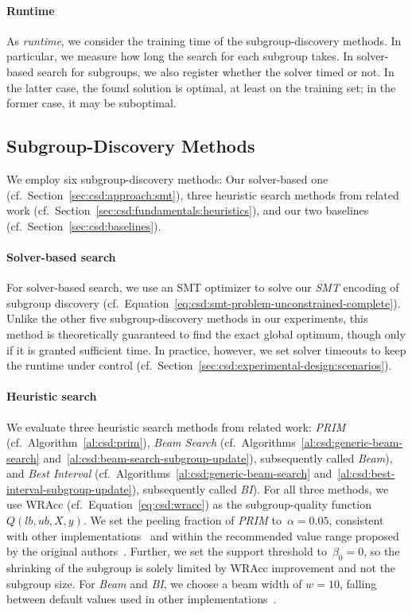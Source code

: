 \documentclass{article}
\theoremstyle{definition}
\begin{document}
\paragraph{Runtime}

As \emph{runtime}, we consider the training time of the subgroup-discovery methods.
In particular, we measure how long the search for each subgroup takes.
In solver-based search for subgroups, we also register whether the solver timed or not.
In the latter case, the found solution is optimal, at least on the training set; in the former case, it may be suboptimal.

\subsection{Subgroup-Discovery Methods}
\label{sec:csd:experimental-design:methods}

We employ six subgroup-discovery methods:
Our solver-based one (cf.~Section~\ref{sec:csd:approach:smt}), three heuristic search methods from related work (cf.~Section~\ref{sec:csd:fundamentals:heuristics}), and our two baselines (cf.~Section~\ref{sec:csd:baselines}).

\paragraph{Solver-based search}

For solver-based search, we use an SMT optimizer to solve our \emph{SMT} encoding of subgroup discovery (cf.~Equation~\ref{eq:csd:smt-problem-unconstrained-complete}).
Unlike the other five subgroup-discovery methods in our experiments, this method is theoretically guaranteed to find the exact global optimum, though only if it is granted sufficient time.
In practice, however, we set solver timeouts to keep the runtime under control (cf.~Section~\ref{sec:csd:experimental-design:scenarios}).

\paragraph{Heuristic search}

We evaluate three heuristic search methods from related work:
\emph{PRIM} (cf.~Algorithm~\ref{al:csd:prim}), \emph{Beam Search} (cf.~Algorithms~\ref{al:csd:generic-beam-search} and~\ref{al:csd:beam-search-subgroup-update}), subsequently called \emph{Beam}), and \emph{Best Interval} (cf.~Algorithms~\ref{al:csd:generic-beam-search} and~\ref{al:csd:best-interval-subgroup-update}), subsequently called \emph{BI}).
For all three methods, we use WRAcc (cf.~Equation~\ref{eq:csd:wracc}) as the subgroup-quality function~$Q(\mathit{lb}, \mathit{ub}, X, y)$.
We set the peeling fraction of \emph{PRIM} to~$\alpha = 0.05$, consistent with other implementations~\cite{arzamasov2021reds, kwakkel2017exploratory} and within the recommended value range proposed by the original authors~\cite{friedman1999bump}.
Further, we set the support threshold to~$\beta_0 = 0$, so the shrinking of the subgroup is solely limited by WRAcc improvement and not the subgroup size.
For \emph{Beam} and \emph{BI}, we choose a beam width of $w=10$, falling between default values used in other implementations~\cite{arzamasov2021reds, lemmerich2019pysubgroup}.
\end{document}
